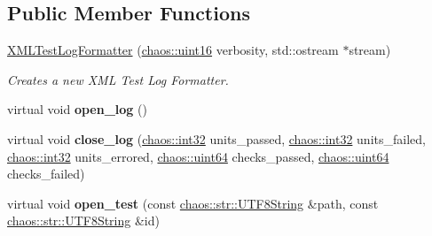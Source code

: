 \subsection*{Public Member Functions}
\begin{DoxyCompactItemize}
\item 
\hypertarget{classchaos_1_1test_1_1log__formatter_1_1_x_m_l_test_log_formatter_a8d1b98b0cf9a475b4ed5984b2b9a3435}{}\hyperlink{classchaos_1_1test_1_1log__formatter_1_1_x_m_l_test_log_formatter_a8d1b98b0cf9a475b4ed5984b2b9a3435}{X\+M\+L\+Test\+Log\+Formatter} (\hyperlink{namespacechaos_ac3888b1c9e56da7fbbdb3ab8425b4068}{chaos\+::uint16} verbosity, std\+::ostream $\ast$stream)\label{classchaos_1_1test_1_1log__formatter_1_1_x_m_l_test_log_formatter_a8d1b98b0cf9a475b4ed5984b2b9a3435}

\begin{DoxyCompactList}\small\item\em Creates a new X\+M\+L Test Log Formatter. \end{DoxyCompactList}\item 
\hypertarget{classchaos_1_1test_1_1log__formatter_1_1_x_m_l_test_log_formatter_a4103c24daf83bff69ad23ba4a7d7e2ad}{}virtual void {\bfseries open\+\_\+log} ()\label{classchaos_1_1test_1_1log__formatter_1_1_x_m_l_test_log_formatter_a4103c24daf83bff69ad23ba4a7d7e2ad}

\item 
\hypertarget{classchaos_1_1test_1_1log__formatter_1_1_x_m_l_test_log_formatter_a64b92b5065e08468c01074259f0ec551}{}virtual void {\bfseries close\+\_\+log} (\hyperlink{namespacechaos_ad1de7efb430365afd2c9446a0f522a90}{chaos\+::int32} units\+\_\+passed, \hyperlink{namespacechaos_ad1de7efb430365afd2c9446a0f522a90}{chaos\+::int32} units\+\_\+failed, \hyperlink{namespacechaos_ad1de7efb430365afd2c9446a0f522a90}{chaos\+::int32} units\+\_\+errored, \hyperlink{namespacechaos_a34fe5f5bfc3ef6d80b5d094ed91b4d6e}{chaos\+::uint64} checks\+\_\+passed, \hyperlink{namespacechaos_a34fe5f5bfc3ef6d80b5d094ed91b4d6e}{chaos\+::uint64} checks\+\_\+failed)\label{classchaos_1_1test_1_1log__formatter_1_1_x_m_l_test_log_formatter_a64b92b5065e08468c01074259f0ec551}

\item 
\hypertarget{classchaos_1_1test_1_1log__formatter_1_1_x_m_l_test_log_formatter_a75659e6702e789ad344c061ab65a89c5}{}virtual void {\bfseries open\+\_\+test} (const \hyperlink{classchaos_1_1str_1_1_u_t_f8_string}{chaos\+::str\+::\+U\+T\+F8\+String} \&path, const \hyperlink{classchaos_1_1str_1_1_u_t_f8_string}{chaos\+::str\+::\+U\+T\+F8\+String} \&id)\label{classchaos_1_1test_1_1log__formatter_1_1_x_m_l_test_log_formatter_a75659e6702e789ad344c061ab65a89c5}


\end{DoxyCompactItemize}
